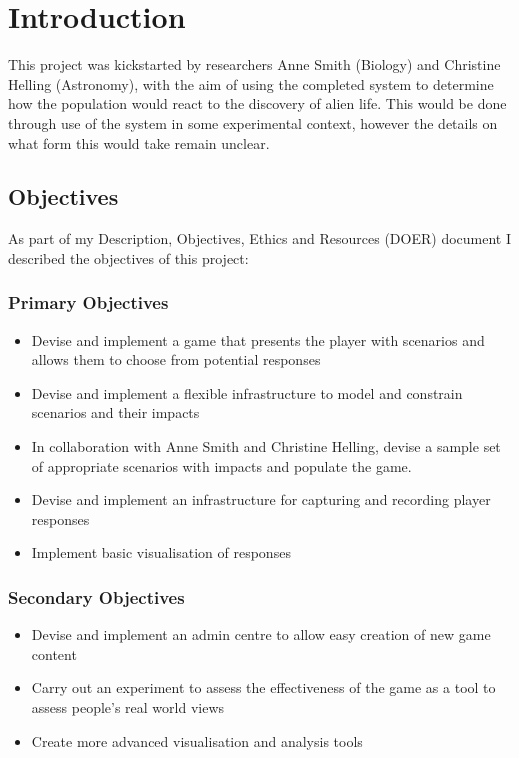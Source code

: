 \chapter{Introduction}
This project was kickstarted by researchers Anne Smith (Biology) and Christine Helling (Astronomy), with the aim of using the completed system to determine how the population would react to the discovery of alien life. This would be done through use of the system in some experimental context, however the details on what form this would take remain unclear. 


\section{Objectives}
As part of my Description, Objectives, Ethics and Resources (DOER) document I described the objectives of this project:

\subsection{Primary Objectives}
\begin{itemize}
    \item Devise and implement a game that presents the player with scenarios and allows them to choose from potential responses
    \item Devise and implement a flexible infrastructure to model and constrain scenarios and their impacts
    \item In collaboration with Anne Smith and Christine Helling, devise a sample set of appropriate scenarios with impacts and populate the game.
    \item Devise and implement an infrastructure for capturing and recording player responses
    \item Implement basic visualisation of responses
\end{itemize}
\subsection{Secondary Objectives}
\begin{itemize}
    \item Devise and implement an admin centre to allow easy creation of new game content
    \item Carry out an experiment to assess the effectiveness of the game as a tool to assess people's real world views
    \item Create more advanced visualisation and analysis tools
\end{itemize}

